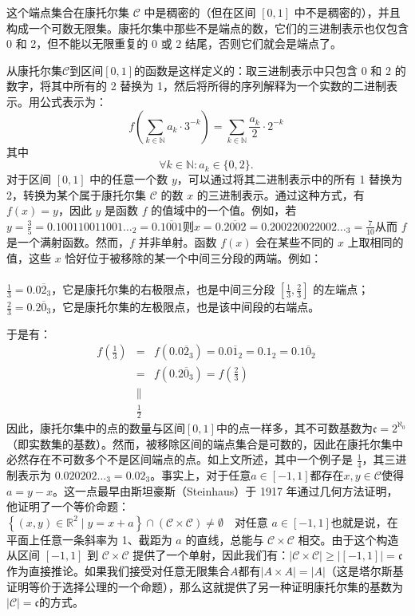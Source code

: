 这个端点集合在康托尔集 $\mathcal{C}$ 中是稠密的（但在区间 $[0,1]$ 中不是稠密的），并且构成一个可数无限集。康托尔集中那些不是端点的数，它们的三进制表示也仅包含 0 和 2，但不能以无限重复的 0 或 2 结尾，否则它们就会是端点了。

从康托尔集$\mathcal{C}$到区间$[0,1]$的函数是这样定义的：取三进制表示中只包含 0 和 2 的数字，将其中所有的 2 替换为 1，然后将所得的序列解释为一个实数的二进制表示。用公式表示为：
$$
f\left(\sum_{k \in \mathbb{N}} a_k \cdot 3^{-k} \right) = \sum_{k \in \mathbb{N}} \frac{a_k}{2} \cdot 2^{-k}~
$$
其中
$$
\forall k \in \mathbb{N} : a_k \in \{0, 2\}.~
$$
对于区间 $[0,1]$ 中的任意一个数 $y$，可以通过将其二进制表示中的所有 1 替换为 2，转换为某个属于康托尔集 $\mathcal{C}$ 的数 $x$ 的三进制表示。通过这种方式，有 $f(x) = y$，因此 $y$ 是函数 $f$ 的值域中的一个值。例如，若$y = \frac{3}{5} = 0.100110011001\ldots_2 = 0.\overline{1001}$则$x = 0.\overline{2002}= 0.200220022002\ldots_3 = \frac{7}{10}$从而 $f$ 是一个满射函数。然而，$f$ 并非单射。函数 $f(x)$ 会在某些不同的 $x$ 上取相同的值，这些 $x$ 恰好位于被移除的某一个中间三分段的两端。例如：\\\\
$\frac{1}{3} = 0.0\overline{2}_3$，它是康托尔集的右极限点，也是中间三分段 $[ \frac{1}{3}, \frac{2}{3} ]$ 的左端点；\\
$\frac{2}{3} = 0.2\overline{0}_3$，它是康托尔集的左极限点，也是该中间段的右端点。

于是有：
$$
\begin{array}{lcl}
f\left( \frac{1}{3} \right) &=& f(0.0\overline{2}_3) = 0.0\overline{1}_2 = 0.1_2 = 0.1\overline{0}_2 \\
&=& f(0.2\overline{0}_3) = f\left( \frac{2}{3} \right) \\
&\parallel \\
&\frac{1}{2}
\end{array}~
$$
因此，康托尔集中的点的数量与区间$[0, 1]$中的点一样多，其不可数基数为$\mathfrak{c} = 2^{\aleph_0}$（即实数集的基数）。然而，被移除区间的端点集合是可数的，因此在康托尔集中必然存在不可数多个不是区间端点的点。如上文所述，其中一个例子是 $\frac{1}{4}$，其三进制表示为 $0.020202\ldots_3 = 0.02_3$。事实上，对于任意$a \in [-1, 1]$都存在$x, y \in \mathcal{C}$使得$a = y - x$。这一点最早由斯坦豪斯（Steinhaus）于 1917 年通过几何方法证明，他证明了一个等价命题：$\left\{(x, y) \in \mathbb{R}^2 \mid y = x + a \right\} \cap (\mathcal{C} \times \mathcal{C}) \neq \emptyset\quad \text{对任意 } a \in [-1, 1]$也就是说，在平面上任意一条斜率为 1、截距为 $a$ 的直线，总能与 $\mathcal{C} \times \mathcal{C}$ 相交。由于这个构造从区间 $[-1, 1]$ 到 $\mathcal{C} \times \mathcal{C}$ 提供了一个单射，因此我们有：$|\mathcal{C} \times \mathcal{C}| \geq |[-1, 1]| = \mathfrak{c}$作为直接推论。如果我们接受对任意无限集合$A$都有$|A \times A| = |A|$（这是塔尔斯基证明等价于选择公理的一个命题），那么这就提供了另一种证明康托尔集的基数为$|\mathcal{C}| = \mathfrak{c}$的方式。

